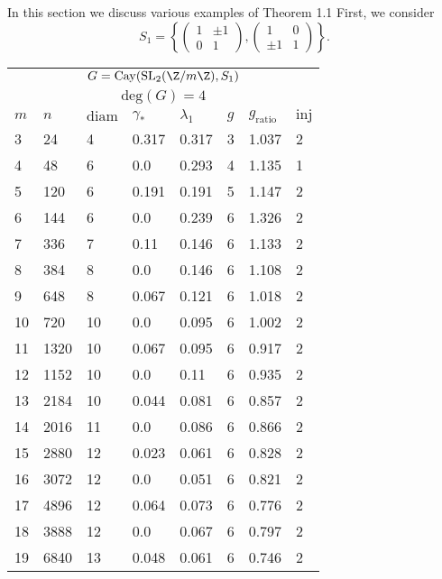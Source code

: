 In this section we discuss various examples of Theorem 1.1  First, we consider
$$S_1 = \left\{  \begin{pmatrix}
1 & \pm 1 \\ 0 & 1
\end{pmatrix}, \begin{pmatrix}
1 & 0 \\ \pm 1 & 1
\end{pmatrix}  \right\}.$$  

\vspace{2em}

\begin{center}
	\begin{tabular}{ p{1cm}|p{1cm}|p{1cm}|p{1cm}|p{1cm}|p{1cm}|p{1cm}|p{1cm} }
		\multicolumn{8}{c}{$G = \mathrm{Cay}(\mathrm{SL}_2(\Z/m\Z),S_1)$} \\
		\multicolumn{8}{c}{$\mathrm{deg}(G) = 4$} \\
		\hline
		$m$ & $n$ &  $\mathrm{diam}$ & $\gamma_*$ &  $\lambda_1$ & $g$ & $g_{\mathrm{ratio}}$ & $\mathrm{inj}$     \\
		\hline
		3 & 24 & 4 &  0.317 & 0.317 & 3 & 1.037 & 2 \\
		4 & 48 & 6 &  0.0 & 0.293 & 4 & 1.135 & 1 \\
		5 & 120 & 6 &  0.191 & 0.191 & 5 & 1.147 & 2 \\
		6 & 144 & 6 &  0.0 & 0.239 & 6 & 1.326 & 2 \\
		7 & 336 & 7 &  0.11 & 0.146 & 6 & 1.133 & 2 \\
		8 & 384 & 8 &  0.0 & 0.146 & 6 & 1.108 & 2 \\
		9 & 648 & 8 &  0.067 & 0.121 & 6 & 1.018 & 2 \\
		10 & 720 & 10 &  0.0 & 0.095 & 6 & 1.002 & 2 \\
		11 & 1320 & 10 &  0.067 & 0.095 & 6 & 0.917 & 2 \\
		12 & 1152 & 10 &  0.0 & 0.11 & 6 & 0.935 & 2 \\
		13 & 2184 & 10 &  0.044 & 0.081 & 6 & 0.857 & 2 \\
		14 & 2016 & 11 &  0.0 & 0.086 & 6 & 0.866 & 2 \\
		15 & 2880 & 12 &  0.023 & 0.061 & 6 & 0.828 & 2 \\
		16 & 3072 & 12 &  0.0 & 0.051 & 6 & 0.821 & 2 \\
		17 & 4896 & 12 &  0.064 & 0.073 & 6 & 0.776 & 2 \\
		18 & 3888 & 12 &  0.0 & 0.067 & 6 & 0.797 & 2 \\
		19 & 6840 & 13 &  0.048 & 0.061 & 6 & 0.746 & 2 \\

\end{tabular}
\end{center}
